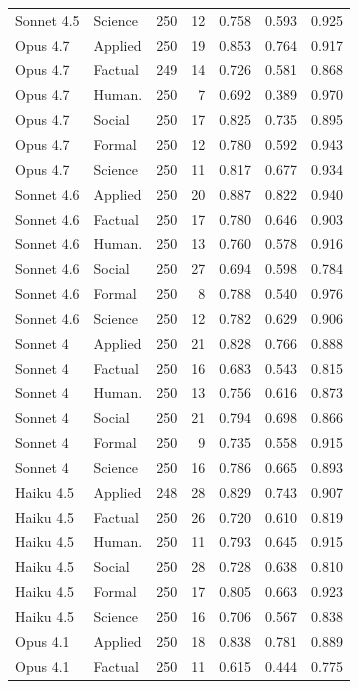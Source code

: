 \begin{longtable}{llrrrrr}
Sonnet 4.5 & Science & 250 & 12 & 0.758 & 0.593 & 0.925 \\
Opus 4.7 & Applied & 250 & 19 & 0.853 & 0.764 & 0.917 \\
Opus 4.7 & Factual & 249 & 14 & 0.726 & 0.581 & 0.868 \\
Opus 4.7 & Human. & 250 & 7 & 0.692 & 0.389 & 0.970 \\
Opus 4.7 & Social & 250 & 17 & 0.825 & 0.735 & 0.895 \\
Opus 4.7 & Formal & 250 & 12 & 0.780 & 0.592 & 0.943 \\
Opus 4.7 & Science & 250 & 11 & 0.817 & 0.677 & 0.934 \\
Sonnet 4.6 & Applied & 250 & 20 & 0.887 & 0.822 & 0.940 \\
Sonnet 4.6 & Factual & 250 & 17 & 0.780 & 0.646 & 0.903 \\
Sonnet 4.6 & Human. & 250 & 13 & 0.760 & 0.578 & 0.916 \\
Sonnet 4.6 & Social & 250 & 27 & 0.694 & 0.598 & 0.784 \\
Sonnet 4.6 & Formal & 250 & 8 & 0.788 & 0.540 & 0.976 \\
Sonnet 4.6 & Science & 250 & 12 & 0.782 & 0.629 & 0.906 \\
Sonnet 4 & Applied & 250 & 21 & 0.828 & 0.766 & 0.888 \\
Sonnet 4 & Factual & 250 & 16 & 0.683 & 0.543 & 0.815 \\
Sonnet 4 & Human. & 250 & 13 & 0.756 & 0.616 & 0.873 \\
Sonnet 4 & Social & 250 & 21 & 0.794 & 0.698 & 0.866 \\
Sonnet 4 & Formal & 250 & 9 & 0.735 & 0.558 & 0.915 \\
Sonnet 4 & Science & 250 & 16 & 0.786 & 0.665 & 0.893 \\
Haiku 4.5 & Applied & 248 & 28 & 0.829 & 0.743 & 0.907 \\
Haiku 4.5 & Factual & 250 & 26 & 0.720 & 0.610 & 0.819 \\
Haiku 4.5 & Human. & 250 & 11 & 0.793 & 0.645 & 0.915 \\
Haiku 4.5 & Social & 250 & 28 & 0.728 & 0.638 & 0.810 \\
Haiku 4.5 & Formal & 250 & 17 & 0.805 & 0.663 & 0.923 \\
Haiku 4.5 & Science & 250 & 16 & 0.706 & 0.567 & 0.838 \\
Opus 4.1 & Applied & 250 & 18 & 0.838 & 0.781 & 0.889 \\
Opus 4.1 & Factual & 250 & 11 & 0.615 & 0.444 & 0.775 \\

\end{longtable}
